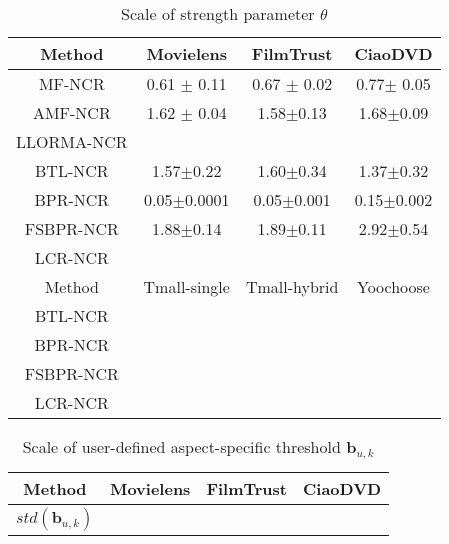 \documentclass[letterpaper]{article} %
\begin{document}
\begin{table}[htp]
\caption{Scale of strength parameter $\theta$}
\begin{center}
\begin{tabular}{|c|c|c|c|}
\hline
Method & Movielens & FilmTrust & CiaoDVD \\\hline
MF-NCR &0.61 $\pm$ 0.11 &0.67 $\pm$ 0.02 &0.77$\pm$ 0.05 \\\hline
AMF-NCR &1.62 $\pm$ 0.04 &1.58$\pm$0.13 &1.68$\pm$0.09 \\\hline
LLORMA-NCR & & & \\\hline
BTL-NCR &1.57$\pm$0.22 &1.60$\pm$0.34 &1.37$\pm$0.32 \\\hline
BPR-NCR &0.05$\pm$0.0001 &0.05$\pm$0.001 &0.15$\pm$0.002 \\\hline
FSBPR-NCR &1.88$\pm$0.14 &1.89$\pm$0.11 &2.92$\pm$0.54 \\\hline
LCR-NCR & & & \\\hline
Method & Tmall-single & Tmall-hybrid & Yoochoose \\\hline
BTL-NCR & & & \\\hline
BPR-NCR & & & \\\hline
FSBPR-NCR & & & \\\hline
LCR-NCR & & & \\\hline
\end{tabular}
\end{center}
\label{tab:theta}
\end{table}%

\begin{table}[htp]
\caption{Scale of user-defined aspect-specific threshold $\mathbf{b}_{u,k}$}
\begin{center}
\begin{tabular}{|c|c|c|c|}
\hline
Method & Movielens & FilmTrust & CiaoDVD \\\hline
$std(\mathbf{b}_{u,k})$ & & & \\\hline
\end{tabular}
\end{center}
\label{tab:bias}
\end{table}%
\end{document}
